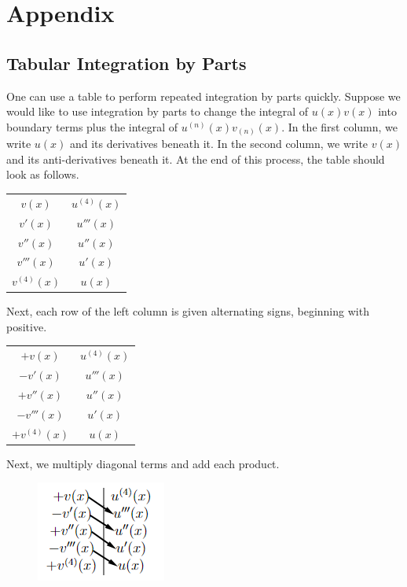 \newpage
\section{Appendix}
\subsection{Tabular Integration by Parts}
\label{appendix:parts}
    One can use a table to perform repeated integration by parts quickly. Suppose we would like to use integration by parts to change the integral of \(u(x)v(x)\) into boundary terms plus the integral of \(u^{(n)}(x)v_{(n)}(x)\). In the first column, we write \(u(x)\) and its derivatives beneath it. In the second column, we write \(v(x)\) and its anti-derivatives beneath it. At the end of this process, the table should look as follows.
    \begin{table}[H]
        \centering
        \begin{tabular}{c|c}
            \(v(x)\) & \(u^{(4)}(x)\)\\
            \(v'(x)\) & \(u'''(x)\)\\
            \(v''(x)\) & \(u''(x)\)\\
            \(v'''(x)\) & \(u'(x)\)\\
            \(v^{(4)}(x)\) &\(u(x)\)
        \end{tabular}
    \end{table}
    Next, each row of the left column is given alternating signs, beginning with positive.
    \begin{table}[H]
        \centering
        \begin{tabular}{c|c}
            \(+v(x)\) & \(u^{(4)}(x)\)\\
            \(-v'(x)\) & \(u'''(x)\)\\
            \(+v''(x)\) & \(u''(x)\)\\
            \(-v'''(x)\) & \(u'(x)\)\\
            \(+v^{(4)}(x)\) &\(u(x)\)
        \end{tabular}
    \end{table}
    Next, we multiply diagonal terms and add each product.
    \begin{figure}[H]
        \centering
        \includegraphics{include/tabular-boundary.png}
    \end{figure}

